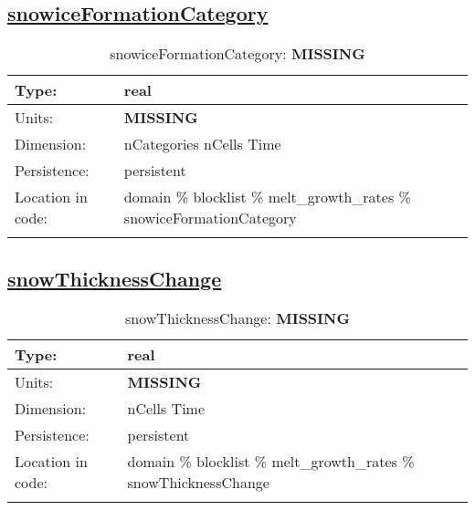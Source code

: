 \subsection[snowiceFormationCategory]{\hyperref[sec:var_tab_melt_growth_rates]{snowiceFormationCategory}}
\label{subsec:var_sec_melt_growth_rates_snowiceFormationCategory}
\begin{center}
\begin{longtable}{| p{2.0in} | p{4.0in} |}
        \hline 
        Type: & real \\
        \hline 
        Units: & {\bf \color{red} MISSING} \\
        \hline 
        Dimension: & nCategories nCells Time \\
        \hline 
        Persistence: & persistent \\
        \hline 
         Location in code: & domain \% blocklist \% melt\_growth\_rates \% snowiceFormationCategory \\
         \hline 
    \caption{snowiceFormationCategory: {\bf \color{red} MISSING}}
\end{longtable}
\end{center}
\subsection[snowThicknessChange]{\hyperref[sec:var_tab_melt_growth_rates]{snowThicknessChange}}
\label{subsec:var_sec_melt_growth_rates_snowThicknessChange}
\begin{center}
\begin{longtable}{| p{2.0in} | p{4.0in} |}
        \hline 
        Type: & real \\
        \hline 
        Units: & {\bf \color{red} MISSING} \\
        \hline 
        Dimension: & nCells Time \\
        \hline 
        Persistence: & persistent \\
        \hline 
         Location in code: & domain \% blocklist \% melt\_growth\_rates \% snowThicknessChange \\
         \hline 
    \caption{snowThicknessChange: {\bf \color{red} MISSING}}
\end{longtable}
\end{center}
